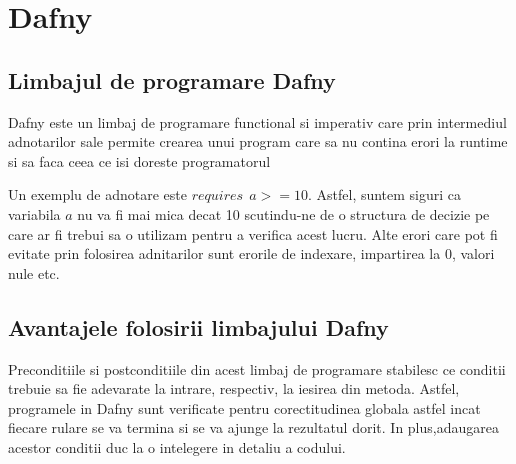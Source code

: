 \chapter{Dafny}

\section{Limbajul de programare Dafny}
Dafny este un limbaj de programare functional si imperativ care prin intermediul adnotarilor sale permite crearea unui program care sa nu contina erori la runtime si sa faca ceea ce isi doreste programatorul\par
Un exemplu de adnotare este $ requires \ \ a >= 10 $. Astfel, suntem siguri ca variabila $a$ nu va fi mai mica decat 10 scutindu-ne de o structura de decizie pe care ar fi trebui sa o utilizam pentru a verifica acest lucru. Alte erori care pot fi evitate prin folosirea adnitarilor sunt erorile de indexare, impartirea la 0, valori nule etc.
\par 


\section{Avantajele folosirii limbajului Dafny}
Preconditiile si postconditiile din acest limbaj de programare stabilesc ce conditii trebuie sa fie adevarate la intrare, respectiv, la iesirea din metoda. Astfel, programele in Dafny sunt verificate pentru corectitudinea globala astfel incat fiecare rulare se va termina si se va ajunge la rezultatul dorit.
In plus,adaugarea acestor conditii duc la o intelegere in detaliu a codului. 




